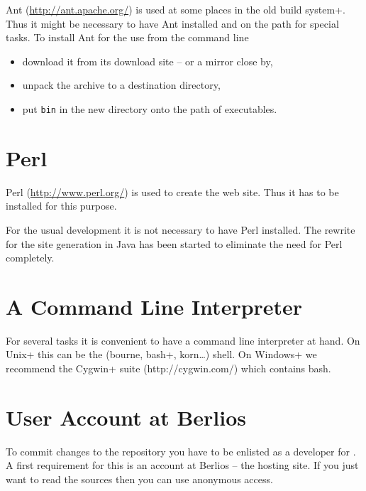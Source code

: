 Ant (\url{http://ant.apache.org/}) is used at some places in the old
\+build system+. Thus it might be necessary to have Ant installed and
on the path for special tasks. To install Ant for the use from the
command line

\begin{itemize}
\item download it from its download site -- or a mirror close by,
\item unpack the archive to a destination directory,
\item put \texttt{bin} in the new directory onto the path of
  executables.
\end{itemize}


\section{Perl}

Perl (\url{http://www.perl.org/}) is used to create the web site. Thus
it has to be installed for this purpose.

For the usual development it is not necessary to have Perl installed. 
The rewrite for the site generation in Java has been started to eliminate 
the need for Perl completely.


\section{A Command Line Interpreter}

For several tasks it is convenient to have a command line interpreter
at hand. On \+Unix+ this can be the (bourne,
\+bash+, korn\ldots) shell. On \+Windows+ we
recommend the \+Cygwin+ suite (http://cygwin.com/) which contains
bash.  


\section{User Account at Berlios}

To commit changes to the repository you have to be enlisted as a
developer for \ExTeX. A first requirement for this is an account at
Berlios -- the hosting site. If you just want to read the sources then
you can use anonymous access.

